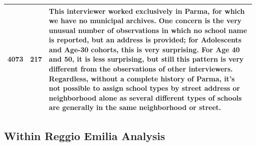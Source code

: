 \begin{table}[H]
\begin{footnotesize}
\begin{tabular}{L{2cm} L{2cm} L{11cm}}
4073	&	217	&	This interviewer worked exclusively in Parma, for which we have no municipal archives. One concern is the very unusual number of observations in which no school name is reported, but an address is provided; for Adolescents and Age-30 cohorts, this is very surprising. For Age 40 and 50, it is less surprising, but still this pattern is very different from the observations of other interviewers. Regardless, without a complete history of Parma, it's not possible to assign school types by street address or neighborhood alone as several different types of schools are generally in the same neighborhood or street.	\\	\bottomrule

\end{tabular}

\end{footnotesize}
\end{table}


\subsection{Within Reggio Emilia Analysis} \label{sec:within-RE-analysis}

